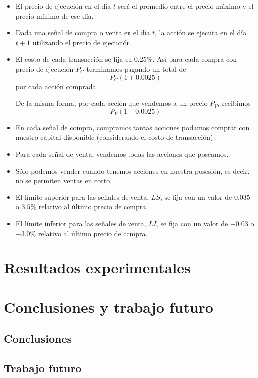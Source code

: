 \documentclass[12pt]{scrbook}
\theoremstyle{break}
\theoremstyle{break}
\begin{document}
\begin{itemize}
\item El precio de ejecución en el día $t$ será el promedio entre el precio máximo y el precio mínimo de ese día.

\item Dada una señal de compra o venta en el día $t$, la acción se ejecuta en el día $t+1$ utilizando el precio de ejecución.

\item El costo de cada transacción se fija en $0.25\%$. Así para cada compra con precio de ejecución $P_{C}$ terminamos pagando un total de 
$$P_{C}(1 + 0.0025)$$
por cada acción comprada.

De la misma forma, por cada acción que vendemos a un precio $P_{V}$, recibimos 
$$P_{V}(1 - 0.0025)$$

\item En cada señal de compra, compramos tantas acciones podamos comprar con nuestro capital disponible (considerando el costo de transacción).

\item Para cada señal de venta, vendemos todas las acciones que poseamos.

\item Sólo podemos vender cuando tenemos acciones en nuestra posesión, es decir, no se permiten ventas en corto.

\item El límite superior para las señales de venta, $LS$, se fija con un valor de $0.035$ o $3.5\%$ relativo al último precio de compra.

\item El límite inferior para las señales de venta, $LI$, se fija con un valor de $-0.03$ o $-3.0\%$ relativo al último precio de compra. 
\end{itemize}

\chapter{Resultados experimentales}
\label{capitulo:resultados experimentales}

\chapter{Conclusiones y trabajo futuro}
\label{capitulo:conclusiones}

\section{Conclusiones}
\label{seccion:conclusiones}

\section{Trabajo futuro}
\label{seccion:trabajo futuro}




\end{document}
